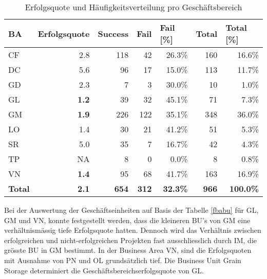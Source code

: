 \begin{table}[H]
	\centering
	\caption{Erfolgsquote und Häufigkeitsverteilung pro Geschäftsbereich}
	\begin{tabular}{lrrrrrr}
		\textbf{BA}   & \multicolumn{1}{l}{\textbf{Erfolgsquote}} & \multicolumn{1}{l}{\textbf{Success}} & \multicolumn{1}{l}{\textbf{Fail}} & \multicolumn{1}{l}{\textbf{Fail [\%]}} & \multicolumn{1}{l}{\textbf{Total}} & \multicolumn{1}{l}{\textbf{Total [\%]}} \\ \hline
		CF    & 2.8   & 118   & 42    & 26.3\% & 160   & 16.6\% \\
		DC    & 5.6   & 96    & 17    & 15.0\% & 113   & 11.7\% \\
		GD    & 2.3   & 7     & 3     & 30.0\% & 10    & 1.0\% \\
		GL    & \textbf{1.2}  & 39    & 32    & 45.1\% & 71    & 7.3\% \\
		GM    & \textbf{1.9}   & 226   & 122   & 35.1\% & 348   & 36.0\% \\
		LO    & 1.4   & 30    & 21    & 41.2\% & 51    & 5.3\% \\
		SR    & 5.0   & 35    & 7     & 16.7\% & 42    & 4.3\% \\
		TP    & NA      & 8     & 0     & 0.0\% & 8     & 0.8\% \\
		VN    & \textbf{1.4}   & 95    & 68    & 41.7\% & 163   & 16.9\% \\\hline
		\textbf{Total } & \textbf{2.1} & \textbf{654} & \textbf{312} & \textbf{32.3\%} & \textbf{966} & \textbf{100.0\%} \\
	\end{tabular}%
	\label{fba}%
\end{table}%
Bei der Auswertung der Geschäftseinheiten auf Basis der Tabelle \ref{fbabu} für GL, GM und VN, konnte festgestellt werden, dass die kleineren BU's von GM eine verhältnismässig tiefe Erfolgsquote hatten. Dennoch wird das Verhältnis zwischen erfolgreichen und nicht-erfolgreichen Projekten fast ausschliesslich durch IM, die grösste BU in GM bestimmt. In der Business Area VN, sind die Erfolgsquoten mit Ausnahme von PN und OL grundsätzlich tief. Die Business Unit Grain Storage determiniert die Geschäftsbereichserfolgsquote von GL.
